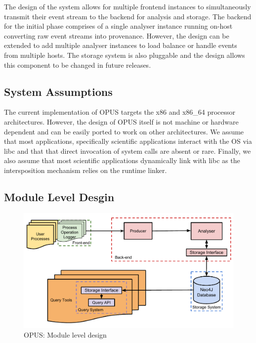 \documentclass[withindex,glossary]{cam-thesis}
\begin{document}
The design of the system allows for multiple frontend instances to simultaneously transmit their event stream to the backend for analysis and storage.
The backend for the initial phase comprises of a single analyser instance running on-host converting raw event streams into provenance.
However, the design can be extended to add multiple analyser instances to load balance or handle events from multiple hosts.
The storage system is also pluggable and the design allows this component to be changed in future releases.

\subsection{System Assumptions}
The current implementation of OPUS targets the x86 and x86\_64 processor architectures.
However, the design of OPUS itself is not machine or hardware dependent and can be easily ported to work on other architectures.
We assume that most applications, specifically scientific applications interact with the OS via libc and that that direct invocation of system calls are absent or rare.
Finally, we also assume that most scientific applications dynamically link with libc as the intersposition mechanism relies on the runtime linker.

\subsection{Module Level Desgin}

\begin{figure}[t!]
  \centering
    \includegraphics[width=1.0\columnwidth]{ProvDesign}
  \caption{OPUS: Module level design}
  \label{fig:opuslld}
\end{figure}
\end{document}
